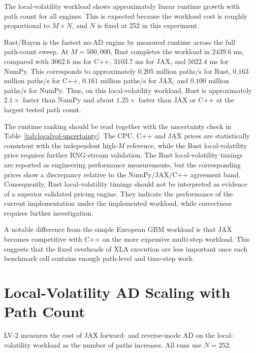 The local-volatility workload shows approximately linear runtime growth with
path count for all engines.  This is expected because the workload cost is
roughly proportional to \(M\times N\), and \(N\) is fixed at 252 in this
experiment.

Rust/Rayon is the fastest no-AD engine by measured runtime across the full path-count sweep.  At
\(M=500{,}000\), Rust completes the workload in \(2439.6\) ms, compared with
\(3062.6\) ms for C++, \(3103.7\) ms for JAX, and \(5022.4\) ms for NumPy.
This corresponds to approximately \(0.205\) million paths/s for Rust,
\(0.163\) million paths/s for C++, \(0.161\) million paths/s for JAX, and
\(0.100\) million paths/s for NumPy.  Thus, on this local-volatility
workload, Rust is approximately \(2.1\times\) faster than NumPy and about
\(1.25\times\) faster than JAX or C++ at the largest tested path count.

The runtime ranking should be read together with the uncertainty check in
Table~\ref{tab:localvol-uncertainty}. The CPU, C++ and JAX prices are
statistically consistent with the independent high-\(M\) reference, while the
Rust local-volatility price requires further RNG-stream validation. The Rust
local-volatility timings are reported as engineering performance measurements,
but the corresponding prices show a discrepancy relative to the NumPy/JAX/C++
agreement band. Consequently, Rust local-volatility timings should not be
interpreted as evidence of a superior validated pricing engine. They indicate
the performance of the current implementation under the implemented workload,
while correctness requires further investigation.

A notable difference from the simple European GBM workload is that JAX
becomes competitive with C++ on the more expensive multi-step workload.  This
suggests that the fixed overheads of XLA execution are less important once
each benchmark cell contains enough path-level and time-step work.

\section{Local-Volatility AD Scaling with Path Count}
\label{sec:results-lv2}

LV-2 measures the cost of JAX forward- and reverse-mode AD on the
local-volatility workload as the number of paths increases.  All runs use
\(N=252\).

